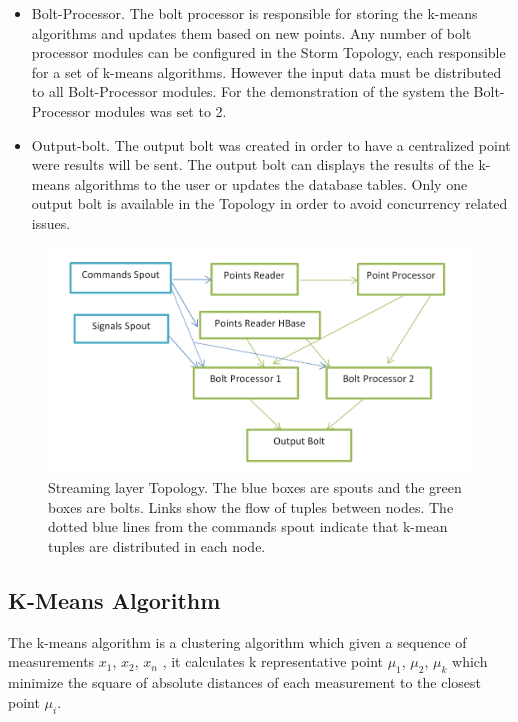 \documentclass{lmproj}
\begin{document}
\begin{itemize}
	\item Bolt-Processor. The bolt processor is responsible for storing the k-means algorithms and updates them based on new points.  Any number of bolt processor modules can be configured in the Storm Topology, each responsible for a set of k-means algorithms. However the input data must be distributed to all Bolt-Processor modules. For the demonstration of the system the Bolt-Processor modules was set to 2.
	\item Output-bolt. The output bolt was created in order to have a centralized point were results will be sent. The output bolt can displays the results of the k-means algorithms to the user or updates the database tables. Only one output bolt is available in the Topology in order to avoid concurrency related issues.
	
\end{itemize}

\begin{figure}[H]
	\centering	
	\includegraphics[scale=0.5]{topology}
	\caption{Streaming layer Topology. The blue boxes are spouts and the green boxes are bolts. Links show the flow of tuples between nodes. The dotted blue lines from the commands spout indicate that k-mean tuples are distributed in each node.}
\end{figure}


\subsection{K-Means Algorithm}

The k-means algorithm is a clustering algorithm which given a sequence of measurements $x_{1}$, $x_{2}$, $x_{n}$ , it calculates k representative point $\mu_{1}$, $\mu_{2}$, $\mu_{k}$ which minimize the square of absolute distances of each measurement to the closest point $\mu_{i}$.
\end{document}
